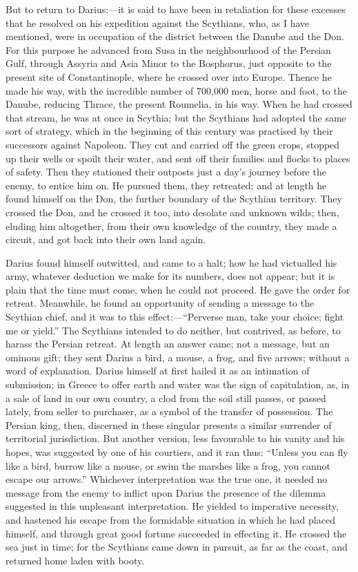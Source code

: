 But to return to Darius:—it
is said to have been in retaliation for these excesses that he
resolved on his expedition against the Scythians, who, as I have
mentioned, were in occupation of the district between the Danube and
the Don. For this purpose he advanced from Susa in the neighbourhood
of the Persian Gulf, through Assyria and Asia Minor to the Bosphorus,
just opposite to the present site of Constantinople, where he crossed
over into Europe. Thence he made his way, with the incredible number
of 700,000 men, horse and foot, to the Danube, reducing Thrace, the
present Roumelia, in his way. When he had crossed that stream, he was
at once in Scythia; but the Scythians had adopted the same sort of
strategy, which in the beginning of this century was practised by
their successors against Napoleon. They cut and carried off the green
crops, stopped up their wells or spoilt their water, and sent off
their families and flocks to places of safety. Then they stationed
their outposts just a day's journey before the enemy, to entice him
on. He pursued them, they retreated; and at length he found himself on
the Don, the further boundary of the Scythian territory. They crossed
the Don, and he crossed it too, into desolate and unknown wilds; then,
eluding him altogether, from their own knowledge of the country, they
made a circuit, and got back into their own land again.

Darius found himself
outwitted, and came to a halt; how he had victualled his army,
whatever deduction we make for its numbers, does not appear; but it is
plain that the time must come, when he could not proceed. He gave the
order for retreat. Meanwhile, he found an opportunity of sending a
message to the Scythian chief, and it was to this effect:—``Perverse
man, take your choice; fight me or yield.'' The Scythians intended to
do neither, but contrived, as before, to harass the Persian retreat.
At length an answer came; not a message, but an ominous gift; they
sent Darius a bird, a mouse, a frog, and five arrows; without a word
of explanation. Darius himself at first hailed it as an intimation of
submission; in Greece to offer earth and water was the sign of
capitulation, as, in a sale of land in our own country, a clod from
the soil still passes, or passed lately, from seller to purchaser, as
a symbol of the transfer of possession. The Persian king, then,
discerned in these singular presents a similar surrender of
territorial jurisdiction. But another version, less favourable to his
vanity and his hopes, was suggested by one of his courtiers, and it
ran thus: ``Unless you can fly like a bird, burrow like a mouse, or
swim the marshes like a frog, you cannot escape our arrows.'' Whichever
interpretation was the true one, it needed no message from the enemy
to inflict upon Darius the presence of the dilemma suggested in this
unpleasant interpretation. He yielded to imperative necessity, and
hastened his escape from the formidable situation in which he had
placed himself, and through great good fortune succeeded in effecting
it. He crossed the sea just in time; for the Scythians came down in
pursuit, as far as the coast, and returned home laden with booty.


